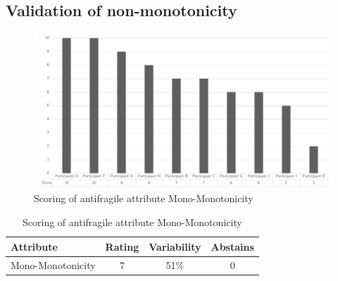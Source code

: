 \subsection{Validation of non-monotonicity}
\begin{figure}[H]
	\centering
	\includegraphics[width=0.9\linewidth]{images/scoreafmonomonotonicity}
	\caption[Scoring of antifragile attribute Mono-Monotonicity]{Scoring of antifragile attribute Mono-Monotonicity}
	\label{fig:appscoringafmonomonotonicity}
\end{figure}
\begin{table}[H]
	\centering
	\begin{tabular}{p{}ccc}
		\toprule
		\textbf{Attribute} & \textbf{Rating} & \textbf{Variability} & \textbf{Abstains} \\
		\midrule
		Mono-Monotonicity & 7 & 51\% & 0 \\%
		\bottomrule
	\end{tabular}%
	\caption[Scoring of antifragile attribute Mono-Monotonicity]{Scoring of antifragile attribute Mono-Monotonicity}
	\label{tab:appscoringafmonomonotonicity}%
\end{table}%
\newpage
